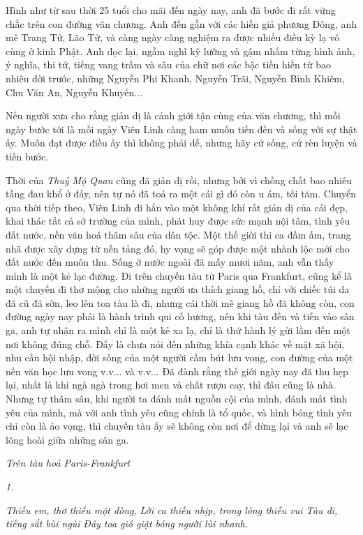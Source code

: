 \documentclass[../main.tex]{subfiles}
\begin{document}
\begin{multicols}{2}
Hình như từ sau thời 25 tuổi cho mãi đến ngày nay, anh đã bước đi rất vững chắc trên con đường văn chương. Anh đến gần với các hiền giả phương Đông, anh mê Trang Tử, Lão Tử, và càng ngày càng nghiệm ra được nhiều điều kỳ lạ vô cùng ở kinh Phật. Anh đọc lại, ngẫm nghĩ kỹ lưỡng và gậm nhấm từng hình ảnh, ý nghĩa, thi tứ, tiếng vang trầm và sâu của chữ nơi các bậc tiền hiền từ bao nhiêu đời trước, những Nguyễn Phi Khanh, Nguyễn Trãi, Nguyễn Bỉnh Khiêm, Chu Văn An, Nguyễn Khuyến... 

Nếu người xưa cho rằng giản dị là cảnh giới tận cùng của văn chương, thì mỗi ngày bước tới là mỗi ngày Viên Linh càng ham muốn tiến đến và sống với sự thật ấy. Muốn đạt được điều ấy thì không phải dễ, nhưng hãy cứ sống, cứ rèn luyện và tiến bước. 

Thời của \textit{Thuỷ Mộ Quan} cũng đã giản dị rồi, nhưng bởi vì chồng chất bao nhiêu tầng đau khổ ở đấy, nên tự nó đã toả ra một cái gì đó còn u ám, tối tăm. Chuyển qua thời tiếp theo, Viên Linh đi hẳn vào một không khí rất giản dị của cái đẹp, khai thác tất cả sở trường của mình, phát huy được sức mạnh nội tâm, tình yêu đất nước, nền văn hoá thâm sâu của dân tộc. Một thế giới thi ca đầm ấm, trang nhã được xây dựng từ nền tảng đó, hy vọng sẽ góp được một nhành lộc mới cho đất nước đến muôn thu. Sống ở nước ngoài đã mấy mươi năm, anh vẫn thấy mình là một kẻ lạc đường. Đi trên chuyến tàu từ Paris qua Frankfurt, cũng kể là một chuyến đi thơ mộng cho những người ưa thích giang hồ, chỉ với chiếc túi da đã cũ đã sờn, leo lên toa tàu là đi, nhưng cái thời mê giang hồ đã không còn, con đường ngày nay phải là hành trình qui cố hương, nên khi tàu đến và tiến vào sân ga, anh tự nhận ra mình chỉ là một kẻ xa lạ, chỉ là thứ hành lý gửi lầm đến một nơi không đúng chỗ. Đấy là chưa nói đến những khía cạnh khác về mặt xã hội, nhu cầu hội nhập, đời sống của một người cầm bút lưu vong, con đường của một nền văn học lưu vong v.v... và v.v... Đã đành rằng thế giới ngày nay đã thu hẹp lại, nhất là khi ngà ngà trong hơi men và chất rượu cay, thì đâu cũng là nhà. Nhưng tự thâm sâu, khi người ta đánh mất nguồn cội của mình, đánh mất tình yêu của mình, mà với anh tình yêu cũng chính là tổ quốc, và hình bóng tình yêu chỉ còn là ảo vọng, thì chuyến tàu ấy sẽ không còn nơi để dừng lại và anh sẽ lạc lõng hoài giữa những sân ga. 

\textit{Trên tàu hoả Paris-Frankfurt} 

\textit{1.} 

\textit{Thiếu em, thơ thiếu một dòng,} 
\textit{Lời ca thiếu nhịp, trong lòng thiếu vui} 
\textit{Tàu đi, tiếng sắt bùi ngùi} 
\textit{Đáy toa gió giật bóng người lùi nhanh.} 


\end{multicols}
\end{document}
